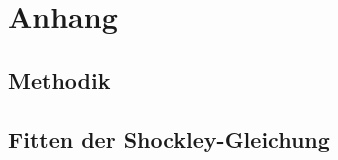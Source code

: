 

\chapter{Anhang}
\label{chap:anhangA}
\section{Methodik}

\section{Fitten der Shockley-Gleichung}

